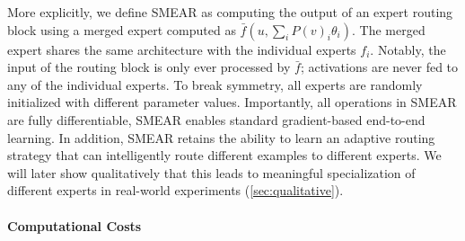 \documentclass{article}
\theoremstyle{plain}
\theoremstyle{definition}
\theoremstyle{remark}
\begin{document}
More explicitly, we define SMEAR as computing the output of an expert routing block using a merged expert computed as $\bar{f}(u, \sum_i P(v)_i \theta_i)$.
The merged expert shares the same architecture with the individual experts $f_i$.
Notably, the input of the routing block is only ever processed by $\bar{f}$; activations are never fed to any of the individual experts.
To break symmetry, all experts are randomly initialized with different parameter values.
Importantly, all operations in SMEAR are fully differentiable, SMEAR enables standard gradient-based end-to-end learning.
In addition, SMEAR retains the ability to learn an adaptive routing strategy that can intelligently route different examples to different experts.
We will later show qualitatively that this leads to meaningful specialization of different experts in real-world experiments (\cref{sec:qualitative}).

\paragraph{Computational Costs}
\end{document}
